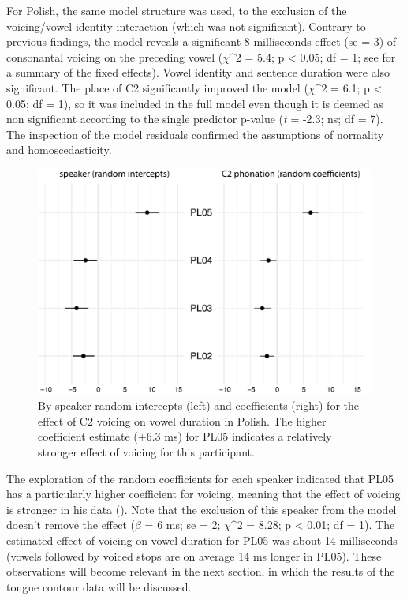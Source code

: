 \documentclass[authoryear, twocolumn]{elsarticle}
\begin{document}
For Polish, the same model structure was used, to the exclusion of the
voicing/vowel-identity interaction (which was not significant). Contrary
to previous findings, the model reveals a significant 8 milliseconds
effect (se = 3) of consonantal voicing on the preceding vowel
(\(\chi\^2\) = 5.4; p \textless{} 0.05; df = 1; see 
for a summary of the fixed effects). Vowel identity and sentence
duration were also significant. The place of C2 significantly improved
the model (\(\chi\^2\) = 6.1; p \textless{} 0.05; df = 1), so it was
included in the full model even though it is deemed as non significant
according to the single predictor p-value (\emph{t} = -2.3; ns; df = 7).
The inspection of the model residuals confirmed the assumptions of
normality and homoscedasticity.

\begin{figure}
    \centering
    \includegraphics[height=.3\textwidth]{fig/polish-re.pdf}
    \caption{By-speaker random intercepts (left) and coefficients (right) for the effect of C2 voicing on vowel duration in Polish. The higher coefficient estimate (+6.3 ms) for PL05 indicates a relatively stronger effect of voicing for this participant.}
    \label{f:polish-re}
\end{figure}

The exploration of the random coefficients for each speaker indicated
that PL05 has a particularly higher coefficient for voicing, meaning
that the effect of voicing is stronger in his data ().
Note that the exclusion of this speaker from the model doesn't remove
the effect (\(\beta\) = 6 ms; se = 2; \(\chi\^2\) = 8.28; p \textless{}
0.01; df = 1). The estimated effect of voicing on vowel duration for
PL05 was about 14 milliseconds (vowels followed by voiced stops are on
average 14 ms longer in PL05). These observations will become relevant
in the next section, in which the results of the tongue contour data
will be discussed.

\end{document}
